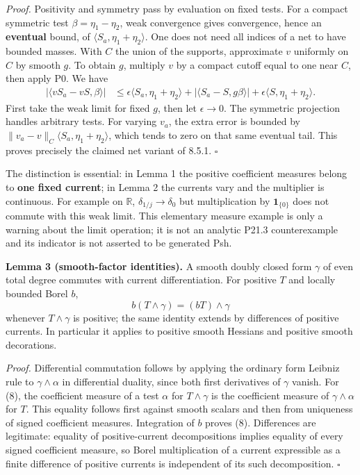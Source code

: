 \documentclass[
  11pt,
]{article}
\begin{document}
\emph{Proof.} Positivity and symmetry pass by evaluation on fixed tests.
For a compact symmetric test \(\beta=\eta_1-\eta_2\), weak convergence
gives convergence, hence an \textbf{eventual} bound, of
\(\langle S_a,\eta_1+\eta_2\rangle\). One does not need all indices of a
net to have bounded masses. With \(C\) the union of the supports,
approximate \(v\) uniformly on \(C\) by smooth \(g\). To obtain \(g\),
multiply \(v\) by a compact cutoff equal to one near \(C\), then apply
P0. We have \[
\begin{split}
|\langle vS_a-vS,\beta\rangle|
 &\leq\epsilon\langle S_a,\eta_1+\eta_2\rangle
       +|\langle S_a-S,g\beta\rangle|
       +\epsilon\langle S,\eta_1+\eta_2\rangle.
\end{split}                                                    \tag{7}
\] First take the weak limit for fixed \(g\), then let \(\epsilon\to0\).
The symmetric projection handles arbitrary tests. For varying \(v_a\),
the extra error is bounded by
\(\|v_a-v\|_C\langle S_a,\eta_1+\eta_2\rangle\), which tends to zero on
that same eventual tail. This proves precisely the claimed net variant
of 8.5.1. \(\square\)

The distinction is essential: in Lemma 1 the positive coefficient
measures belong to \textbf{one fixed current}; in Lemma 2 the currents
vary and the multiplier is continuous. For example on \(\mathbb R\),
\(\delta_{1/j}\to\delta_0\) but multiplication by \(\mathbf1_{\{0\}}\)
does not commute with this weak limit. This elementary measure example
is only a warning about the limit operation; it is not an analytic P21.3
counterexample and its indicator is not asserted to be generated Psh.

\textbf{Lemma 3 (smooth-factor identities).} A smooth doubly closed form
\(\gamma\) of even total degree commutes with current differentiation.
For positive \(T\) and locally bounded Borel \(b\),
\[b(T\wedge\gamma)=(bT)\wedge\gamma                           \tag{8}\]
whenever \(T\wedge\gamma\) is positive; the same identity extends by
differences of positive currents. In particular it applies to positive
smooth Hessians and positive smooth decorations.

\emph{Proof.} Differential commutation follows by applying the ordinary
form Leibniz rule to \(\gamma\wedge\alpha\) in differential duality,
since both first derivatives of \(\gamma\) vanish. For (8), the
coefficient measure of a test \(\alpha\) for \(T\wedge\gamma\) is the
coefficient measure of \(\gamma\wedge\alpha\) for \(T\). This equality
follows first against smooth scalars and then from uniqueness of signed
coefficient measures. Integration of \(b\) proves (8). Differences are
legitimate: equality of positive-current decompositions implies equality
of every signed coefficient measure, so Borel multiplication of a
current expressible as a finite difference of positive currents is
independent of its such decomposition. \(\square\)
\end{document}
